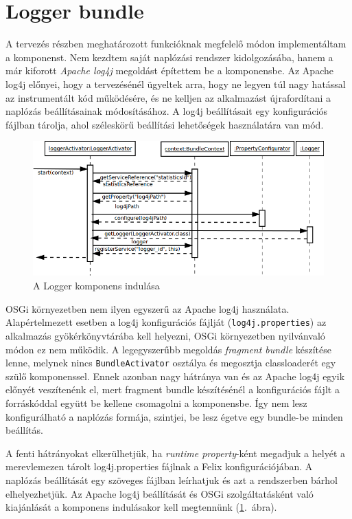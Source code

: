 
\section{Logger bundle}
\label{sec:loggerbundle}

A tervezés részben meghatározott funkcióknak megfelelő módon implementáltam a komponenst. Nem kezdtem saját naplózási rendszer kidolgozásába, hanem a már kiforott \textit{Apache log4j} megoldást építettem be a komponensbe. Az Apache log4j előnyei, hogy a tervezésénél ügyeltek arra, hogy ne legyen túl nagy hatással az instrumentált kód működésére, és ne kelljen az alkalmazást újrafordítani a naplózás beállításainak módosításához. A log4j beállításait egy konfigurációs fájlban tárolja, ahol széleskörű beállítási lehetőségek használatára van mód.

\begin{figure}[htp]
\centering
\includegraphics[scale=0.5]{img/sequence_logger}
\caption{A Logger komponens indulása}
\label{fig:sequence_logger}
\end{figure}

OSGi környezetben nem ilyen egyszerű az Apache log4j használata. Alapértelmezett esetben a log4j konfigurációs fájlját (\texttt{log4j.properties}) az alkalmazás gyökérkönyvtárába kell helyezni, OSGi környezetben nyilvánvaló módon ez nem működik. A legegyszerűbb megoldás \textit{fragment bundle} készítése lenne, melynek nincs \texttt{BundleActivator} osztálya és megosztja classloaderét egy szülő komponenssel. Ennek azonban nagy hátránya van és az Apache log4j egyik előnyét veszítenénk el, mert fragment bundle készítésénél a konfigurációs fájlt a forráskóddal együtt be kellene csomagolni a komponensbe. Így nem lesz konfigurálható a naplózás formája, szintjei, be lesz égetve egy bundle-be minden beállítás.

A fenti hátrányokat elkerülhetjük, ha \textit{runtime property}-ként megadjuk a helyét a merevlemezen tárolt log4j.properties fájlnak a Felix konfigurációjában. A naplózás beállítását egy szöveges fájlban leírhatjuk és azt a rendszerben bárhol elhelyezhetjük. Az Apache log4j beállítását és OSGi szolgáltatásként való kiajánlását a komponens indulásakor kell megtennünk (\ref{fig:sequence_logger}.~ábra).

